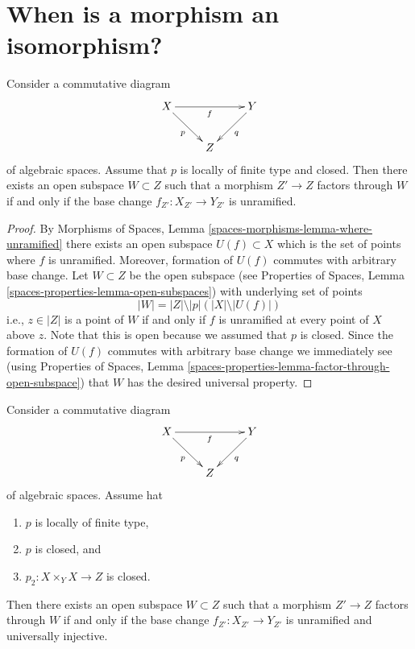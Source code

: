 \section{When is a morphism an isomorphism?}
\label{section-when-isomorphism}


\begin{lemma}
\label{lemma-where-unramified}
Consider a commutative diagram
$$
\xymatrix{
X \ar[rr]_f \ar[rd]_p & & Y \ar[ld]^q \\
& Z
}
$$
of algebraic spaces. Assume that $p$ is locally of finite type and closed.
Then there exists an open subspace $W \subset Z$
such that a morphism $Z' \to Z$ factors through $W$ if and only if the
base change $f_{Z'} : X_{Z'} \to Y_{Z'}$ is unramified.
\end{lemma}

\begin{proof}
By
Morphisms of Spaces, Lemma \ref{spaces-morphisms-lemma-where-unramified}
there exists an open subspace $U(f) \subset X$ which is the set of
points where $f$ is unramified. Moreover, formation of $U(f)$ commutes
with arbitrary base change. Let $W \subset Z$ be the open subspace
(see
Properties of Spaces, Lemma
\ref{spaces-properties-lemma-open-subspaces})
with underlying set of points
$$
|W| = |Z| \setminus |p|\left(|X| \setminus |U(f)|\right)
$$
i.e., $z \in |Z|$ is a point of $W$ if and only if $f$ is unramified
at every point of $X$ above $z$. Note that this is open because we
assumed that $p$ is closed. Since the formation of $U(f)$
commutes with arbitrary base change we immediately see (using
Properties of Spaces, Lemma
\ref{spaces-properties-lemma-factor-through-open-subspace})
that $W$ has the desired universal property.
\end{proof}

\begin{lemma}
\label{lemma-where-unramified-universally-injective}
Consider a commutative diagram
$$
\xymatrix{
X \ar[rr]_f \ar[rd]_p & & Y \ar[ld]^q \\
& Z
}
$$
of algebraic spaces. Assume hat
\begin{enumerate}
\item $p$ is locally of finite type,
\item $p$ is closed, and
\item $p_2 : X \times_Y X \to Z$ is closed.
\end{enumerate}
Then there exists an open subspace $W \subset Z$
such that a morphism $Z' \to Z$ factors through $W$ if and only if the
base change $f_{Z'} : X_{Z'} \to Y_{Z'}$ is unramified and universally
injective.
\end{lemma}

